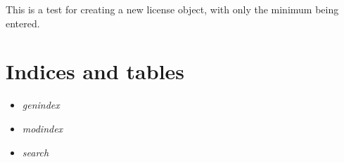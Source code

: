 \documentclass[letterpaper,10pt,english]{sphinxmanual}
\begin{document}
\begin{fulllineitems}
\begin{fulllineitems}
\end{fulllineitems}


\begin{fulllineitems}
\label{api:groups.tests.GroupsModelTests.test_create_license_minimal}
This is a test for creating a new license object, with only the minimum being entered.

\end{fulllineitems}


\end{fulllineitems}



\chapter{Indices and tables}
\label{index:indices-and-tables}\begin{itemize}
\item {} 
\emph{genindex}

\item {} 
\emph{modindex}

\item {} 
\emph{search}

\end{itemize}
\end{document}
